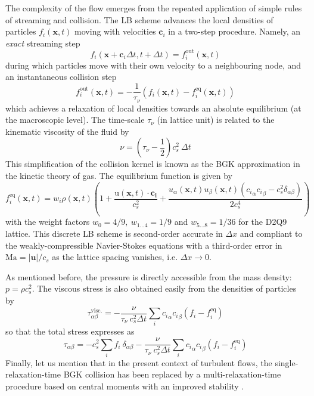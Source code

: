 \documentclass[pre,aps,floatfix,10pt,superscriptaddress, notitlepage,preprint]{revtex4-1}
\begin{document}
%
The complexity of the flow emerges from the repeated application of simple rules of streaming and collision. The LB scheme advances the local densities of particles $f_i(\mathbf{x},t)$ moving with velocities $\mathbf{c}_i$  in a two-step procedure. Namely, an \emph{exact} streaming step 
\[
f_i(\mathbf{x}+\mathbf{c}_i \Delta t, t + \Delta t) = f_i^{\mathrm{out}}(\mathbf{x},t)
\]
during which particles move with their own velocity to a neighbouring node, and an instantaneous collision step
\[
f_i^{\mathrm{out}}(\mathbf{x},t) = -\frac 1 {\tau_\nu} \left(f_i(\mathbf{x},t) - f_i^\mathrm{eq}(\mathbf{x},t) \right)
\]
which achieves a relaxation of local densities towards an absolute equilibrium (at the macroscopic level). The time-scale $\tau_\nu$ (in lattice unit) is related to the kinematic viscosity of the fluid by 
\[
\nu = \left( {\tau_\nu} - \frac 1 2 \right) c_s^2 ~\Delta t
\]
This simplification of the collision kernel is known as the BGK approximation in the kinetic theory of gas.
%
The equilibrium function is given by
\[
f_i^\mathrm{eq}(\mathbf{x},t) = w_i  \rho(\mathbf{x},t) \left( 1 + \frac{\mathrm u(\mathbf{x},t) \cdot \mathbf{c_i}}{c_s^2} +
\frac{u_\alpha(\mathbf{x},t) u_\beta(\mathbf{x},t)({c_i}_\alpha {c_i}_\beta - c_s^2 \delta_{\alpha\beta})}{2 c_s^4} \right)
\] 
with the weight factors $w_0=4/9,~w_{1...4} = 1/9$ and $w_{5...8}=1/36$ for the D2Q9 lattice. 
This discrete LB scheme is second-order accurate in $\Delta x $ and compliant to the weakly-compressible Navier-Stokes equations with a third-order error in $\mathrm{Ma}=|\mathbf{u}|/c_s$ as the lattice spacing vanishes, i.e. $\Delta x \to 0$. 

As mentioned before, the pressure is directly accessible from the mass density: $p = \rho c_s^2$. The viscous stress is also obtained easily from the densities of particles by
\[
\tau^\mathrm{visc.}_{\alpha \beta} = -\frac{\nu}{\tau_\nu ~ c_s^2 \Delta t} \sum_i  {c_i}_\alpha {c_i}_\beta (f_i - f_i^\mathrm{eq})
\]
so that the total stress expresses as
\begin{equation}\label{eq:def_stress}
\tau_{\alpha \beta} = -  c_s^2 \sum_i f_i ~ \delta_{\alpha\beta}  - \frac{\nu}{\tau_\nu ~ c_s^2 \Delta t} \sum_i  {c_i}_\alpha {c_i}_\beta (f_i - f_i^\mathrm{eq})
\end{equation}
Finally, let us mention that in the present context of turbulent flows, the single-relaxation-time BGK collision has been replaced by a multi-relaxation-time procedure based on central moments with an improved stability \cite{De_Rosis_2016}.



\end{document}
